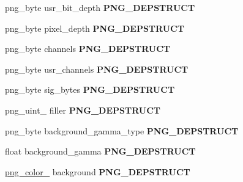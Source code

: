 \begin{DoxyCompactItemize}
\item 
png\+\_\+byte usr\+\_\+bit\+\_\+depth {\bfseries P\+N\+G\+\_\+\+D\+E\+P\+S\+T\+R\+U\+CT}\hypertarget{structpng__struct__def_a72a5ef22fad2dc4c49b30ea2fda9117b}{}\label{structpng__struct__def_a72a5ef22fad2dc4c49b30ea2fda9117b}

\item 
png\+\_\+byte pixel\+\_\+depth {\bfseries P\+N\+G\+\_\+\+D\+E\+P\+S\+T\+R\+U\+CT}\hypertarget{structpng__struct__def_a7ac9ab7966f50520d6121fb05192e5f1}{}\label{structpng__struct__def_a7ac9ab7966f50520d6121fb05192e5f1}

\item 
png\+\_\+byte channels {\bfseries P\+N\+G\+\_\+\+D\+E\+P\+S\+T\+R\+U\+CT}\hypertarget{structpng__struct__def_a807c752a899c92707291bfcce6fab2df}{}\label{structpng__struct__def_a807c752a899c92707291bfcce6fab2df}

\item 
png\+\_\+byte usr\+\_\+channels {\bfseries P\+N\+G\+\_\+\+D\+E\+P\+S\+T\+R\+U\+CT}\hypertarget{structpng__struct__def_a0cb85de11b2abe13aa815c1114f282af}{}\label{structpng__struct__def_a0cb85de11b2abe13aa815c1114f282af}

\item 
png\+\_\+byte sig\+\_\+bytes {\bfseries P\+N\+G\+\_\+\+D\+E\+P\+S\+T\+R\+U\+CT}\hypertarget{structpng__struct__def_a3fd69c408bf417046e7908ecc1fd72a7}{}\label{structpng__struct__def_a3fd69c408bf417046e7908ecc1fd72a7}

\item 
png\+\_\+uint\+\_ filler {\bfseries P\+N\+G\+\_\+\+D\+E\+P\+S\+T\+R\+U\+CT}\hypertarget{structpng__struct__def_aab43d6c3aa8db1823706837f7fcea71a}{}\label{structpng__struct__def_aab43d6c3aa8db1823706837f7fcea71a}

\item 
png\+\_\+byte background\+\_\+gamma\+\_\+type {\bfseries P\+N\+G\+\_\+\+D\+E\+P\+S\+T\+R\+U\+CT}\hypertarget{structpng__struct__def_a0b9e17544ec386196469cb1e73eaad05}{}\label{structpng__struct__def_a0b9e17544ec386196469cb1e73eaad05}

\item 
float background\+\_\+gamma {\bfseries P\+N\+G\+\_\+\+D\+E\+P\+S\+T\+R\+U\+CT}\hypertarget{structpng__struct__def_a3c507b6616921e5081809b910fb3fd85}{}\label{structpng__struct__def_a3c507b6616921e5081809b910fb3fd85}

\item 
\hyperlink{structpng__color__16__struct}{png\+\_\+color\+\_} background {\bfseries P\+N\+G\+\_\+\+D\+E\+P\+S\+T\+R\+U\+CT}\hypertarget{structpng__struct__def_a0530c83b81049b5a96506f9607eaa13a}{}\label{structpng__struct__def_a0530c83b81049b5a96506f9607eaa13a}


\end{DoxyCompactItemize}
